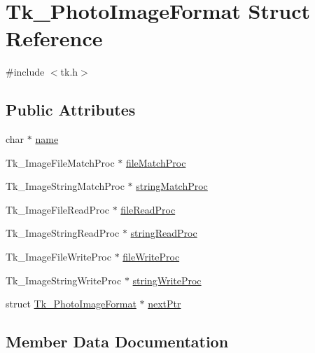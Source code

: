 \hypertarget{struct_tk___photo_image_format}{}\section{Tk\+\_\+\+Photo\+Image\+Format Struct Reference}
\label{struct_tk___photo_image_format}


{\ttfamily \#include $<$tk.\+h$>$}

\subsection*{Public Attributes}
\begin{DoxyCompactItemize}
\item 
char $\ast$ \hyperlink{struct_tk___photo_image_format_af71332629f571a15739ffcfdaa3e189e}{name}
\item 
Tk\+\_\+\+Image\+File\+Match\+Proc $\ast$ \hyperlink{struct_tk___photo_image_format_a140ce196c1691579431baad209e4be40}{file\+Match\+Proc}
\item 
Tk\+\_\+\+Image\+String\+Match\+Proc $\ast$ \hyperlink{struct_tk___photo_image_format_a8acd703ea8ae51743741cf1ed977fc13}{string\+Match\+Proc}
\item 
Tk\+\_\+\+Image\+File\+Read\+Proc $\ast$ \hyperlink{struct_tk___photo_image_format_abad7694c87106ccba8571d2058d49e6f}{file\+Read\+Proc}
\item 
Tk\+\_\+\+Image\+String\+Read\+Proc $\ast$ \hyperlink{struct_tk___photo_image_format_a1f3cf1bee713671b67033aff6ecc4f70}{string\+Read\+Proc}
\item 
Tk\+\_\+\+Image\+File\+Write\+Proc $\ast$ \hyperlink{struct_tk___photo_image_format_a6945c4d73c61e25a7abba47a6af49431}{file\+Write\+Proc}
\item 
Tk\+\_\+\+Image\+String\+Write\+Proc $\ast$ \hyperlink{struct_tk___photo_image_format_a577d032e743abaa18337ddb0bc7fb499}{string\+Write\+Proc}
\item 
struct \hyperlink{struct_tk___photo_image_format}{Tk\+\_\+\+Photo\+Image\+Format} $\ast$ \hyperlink{struct_tk___photo_image_format_add05c1edda9fefcd7a424949107c7798}{next\+Ptr}
\end{DoxyCompactItemize}


\subsection{Member Data Documentation}
